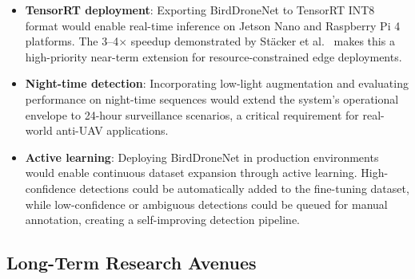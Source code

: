 \documentclass[12pt,a4paper]{report}
\begin{document}
\begin{itemize}
  \item \textbf{TensorRT deployment}: Exporting BirdDroneNet to TensorRT INT8 format would enable real-time inference on Jetson Nano and Raspberry Pi 4 platforms. The 3--4$\times$ speedup demonstrated by Stäcker et al.~\cite{stacker2021} makes this a high-priority near-term extension for resource-constrained edge deployments.
  
  \item \textbf{Night-time detection}: Incorporating low-light augmentation and evaluating performance on night-time sequences would extend the system's operational envelope to 24-hour surveillance scenarios, a critical requirement for real-world anti-UAV applications.
  
  \item \textbf{Active learning}: Deploying BirdDroneNet in production environments would enable continuous dataset expansion through active learning. High-confidence detections could be automatically added to the fine-tuning dataset, while low-confidence or ambiguous detections could be queued for manual annotation, creating a self-improving detection pipeline.
\end{itemize}

\subsection{Long-Term Research Avenues}
\end{document}
